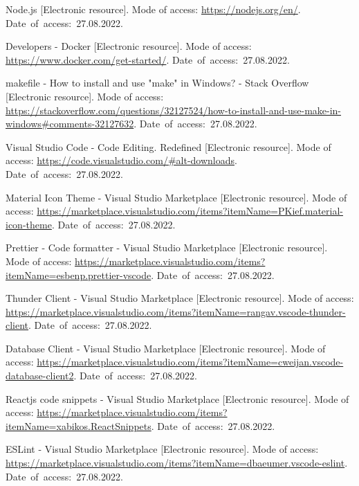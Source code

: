 \begin{thebibliography}{}
  Node.js
  [Electronic resource].
  Mode of access: \url{https://nodejs.org/en/}.
  Date~of~access:~27.08.2022.
  
  Developers - Docker
  [Electronic resource].
  Mode of access: \url{https://www.docker.com/get-started/}.
  Date~of~access:~27.08.2022.

  makefile - How to install and use "make" in Windows? - Stack Overflow
  [Electronic resource].
  Mode of access: \url{https://stackoverflow.com/questions/32127524/how-to-install-and-use-make-in-windows#comments-32127632}.
  Date~of~access:~27.08.2022.

  Visual Studio Code - Code Editing. Redefined
  [Electronic resource].
  Mode of access: \url{https://code.visualstudio.com/#alt-downloads}.
  Date~of~access:~27.08.2022.

  Material Icon Theme - Visual Studio Marketplace
  [Electronic resource].
  Mode of access: \url{https://marketplace.visualstudio.com/items?itemName=PKief.material-icon-theme}.
  Date~of~access:~27.08.2022.

  Prettier - Code formatter - Visual Studio Marketplace
  [Electronic resource].
  Mode of access: \url{https://marketplace.visualstudio.com/items?itemName=esbenp.prettier-vscode}.
  Date~of~access:~27.08.2022.

  Thunder Client - Visual Studio Marketplace
  [Electronic resource].
  Mode of access: \url{https://marketplace.visualstudio.com/items?itemName=rangav.vscode-thunder-client}.
  Date~of~access:~27.08.2022.

  Database Client - Visual Studio Marketplace
  [Electronic resource].
  Mode of access: \url{https://marketplace.visualstudio.com/items?itemName=cweijan.vscode-database-client2}.
  Date~of~access:~27.08.2022.

  Reactjs code snippets - Visual Studio Marketplace
  [Electronic resource].
  Mode of access: \url{https://marketplace.visualstudio.com/items?itemName=xabikos.ReactSnippets}.
  Date~of~access:~27.08.2022.

  ESLint - Visual Studio Marketplace
  [Electronic resource].
  Mode of access: \url{https://marketplace.visualstudio.com/items?itemName=dbaeumer.vscode-eslint}.
  Date~of~access:~27.08.2022.




\end{thebibliography}
